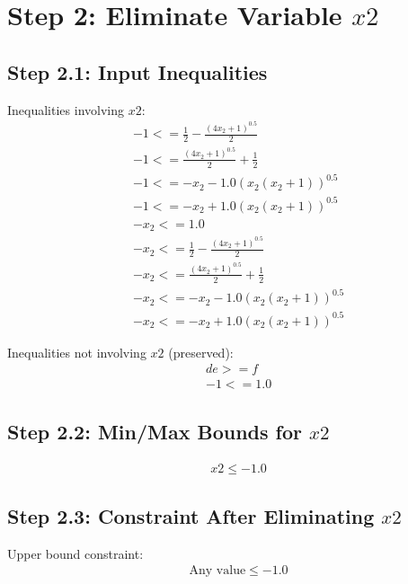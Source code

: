\documentclass{article}
\begin{document}
\section{Step 2: Eliminate Variable $x2$}

\subsection{Step 2.1: Input Inequalities}

Inequalities involving $x2$:
\begin{align}
& -1 <= \frac{1}{2} - \frac{\left(4 x_{2} + 1\right)^{0.5}}{2} \\
& -1 <= \frac{\left(4 x_{2} + 1\right)^{0.5}}{2} + \frac{1}{2} \\
& -1 <= - x_{2} - 1.0 \left(x_{2} \left(x_{2} + 1\right)\right)^{0.5} \\
& -1 <= - x_{2} + 1.0 \left(x_{2} \left(x_{2} + 1\right)\right)^{0.5} \\
& - x_{2} <= 1.0 \\
& - x_{2} <= \frac{1}{2} - \frac{\left(4 x_{2} + 1\right)^{0.5}}{2} \\
& - x_{2} <= \frac{\left(4 x_{2} + 1\right)^{0.5}}{2} + \frac{1}{2} \\
& - x_{2} <= - x_{2} - 1.0 \left(x_{2} \left(x_{2} + 1\right)\right)^{0.5} \\
& - x_{2} <= - x_{2} + 1.0 \left(x_{2} \left(x_{2} + 1\right)\right)^{0.5}
\end{align}

Inequalities not involving $x2$ (preserved):
\begin{align}
& d e >= f \\
& -1 <= 1.0
\end{align}

\subsection{Step 2.2: Min/Max Bounds for $x2$}

\begin{align}
& x2 \leq -1.0
\end{align}

\subsection{Step 2.3: Constraint After Eliminating $x2$}

Upper bound constraint:
\begin{align}
& \text{Any value} \leq -1.0
\end{align}
\end{document}
